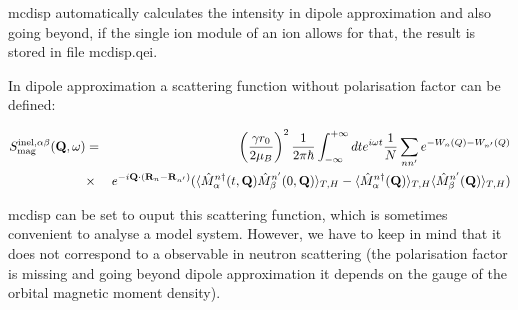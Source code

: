 {\prg mcdisp} automatically calculates the intensity in
dipole approximation and also going beyond, if the single ion module of an
ion allows for that, the result
is stored in file {\prg mcdisp.qei}.

In dipole approximation a scattering function without polarisation factor
can be defined:

\begin{eqnarray}\label{Sinel}
S_{\rm mag}^{\rm inel,\alpha\beta}(\mathbf Q,\omega)&=&\left( \frac{ \gamma r_0}{2 \mu_B}  \right)^2
\frac{1}{2\pi\hbar}\int_{-\infty}^{+\infty}dt e^{i\omega t}
\frac{1}{N}\sum_{nn'} e^{-W_n(Q)- W_{n'}(Q)}\\
&\times&  e^{-i\mathbf Q \cdot (\mathbf R_n-\mathbf R_{n'})}   (\langle \hat M_{\alpha}^{n \dag}(t,\mathbf Q)  \hat M_{\beta}^{n'}(0,\mathbf Q) \rangle_{T,H}
- \langle \hat M^{n \dag}_{\alpha}(\mathbf Q)\rangle_{T,H} \langle \hat M^{n'}_{\beta}(\mathbf Q) \rangle_{T,H})\nonumber
\end{eqnarray}

{\prg mcdisp} can be set to ouput this scattering function, which is sometimes
convenient to analyse a model system. However, we have to keep in mind that
it does not correspond to a observable in neutron scattering (the polarisation
factor is missing and going beyond dipole approximation it depends on the
gauge of the orbital magnetic moment density).







